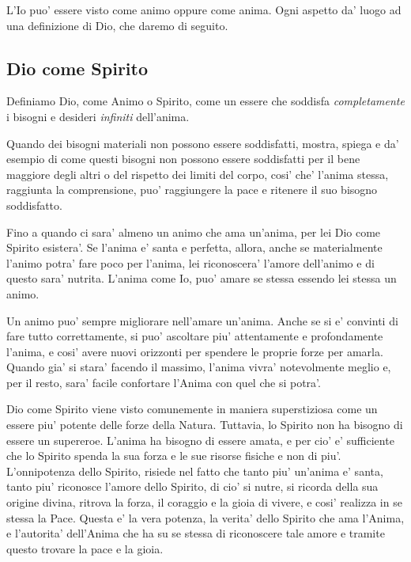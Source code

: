 L'Io puo' essere visto come animo oppure come anima. Ogni aspetto da' luogo ad una definizione di Dio, che daremo di seguito.

\subsection{Dio come Spirito}
\label{DioComeSpirito}

   Definiamo Dio, come Animo o Spirito, come un essere che soddisfa \emph{completamente} i bisogni e desideri \emph{infiniti} dell'anima. 

   Quando dei bisogni materiali non possono essere soddisfatti, mostra, spiega e da' esempio di come questi bisogni non possono essere soddisfatti per il bene maggiore degli altri o del rispetto dei limiti del corpo, cosi' che' l'anima stessa, raggiunta la comprensione, puo' raggiungere la pace e ritenere il suo bisogno soddisfatto.

   Fino a quando ci sara' almeno un animo che ama un'anima, per lei Dio come Spirito esistera'. Se l'anima e' santa e perfetta, allora, anche se materialmente l'animo potra' fare poco per l'anima, lei riconoscera' l'amore dell'animo e di questo sara' nutrita. L'anima come Io, puo' amare se stessa essendo lei stessa un animo.

   Un animo puo' sempre migliorare nell'amare un'anima. Anche se si e' convinti di fare tutto correttamente, si puo' ascoltare piu' attentamente e profondamente l'anima, e cosi' avere nuovi orizzonti per spendere le proprie forze per amarla. 
   Quando gia' si stara' facendo il massimo, l'anima vivra' notevolmente meglio e, per il resto, sara' facile confortare l'Anima con quel che si potra'.

    Dio come Spirito viene visto comunemente in maniera superstiziosa come un essere piu' potente delle forze della Natura. Tuttavia, lo Spirito non ha bisogno di essere un supereroe. L'anima ha bisogno di essere amata, e per cio' e' sufficiente che lo Spirito spenda la sua forza e le sue risorse fisiche e non di piu'. L'onnipotenza dello Spirito, risiede nel fatto che tanto piu' un'anima e' santa, tanto piu' riconosce l'amore dello Spirito, di cio' si nutre, si ricorda della sua origine divina, ritrova la forza, il coraggio e la gioia di vivere, e cosi' realizza in se stessa la Pace.  Questa e' la vera potenza, la verita' dello Spirito che ama l'Anima, e l'autorita' dell'Anima che ha su se stessa di riconoscere tale amore e tramite questo trovare la pace e la gioia.

